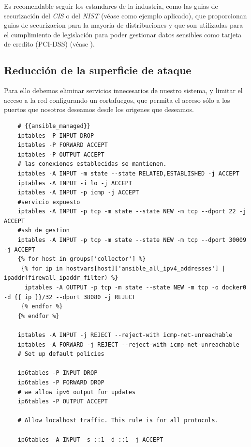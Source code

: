 Es recomendable seguir los estandares de la industria, como las guias de securización del \emph{CIS} o del 
\emph{NIST} (véase \cite{ovh-debian-cis} como ejemplo aplicado), que proporcionan guias de securizacion
para la mayoria de distribuciones y que son utilizadas para el cumplimiento de legislación para poder
gestionar datos sensibles como tarjeta de credito (PCI-DSS) (véase \cite{wiki-pci-dss}). 

\subsection{Reducción de la superficie de ataque}

Para ello debemos eliminar servicios innecesarios de nuestro sistema, y limitar el acceso a la red configurando un cortafuegos, que permita
el acceso sólo a los puertos que nosotros deseamos desde los origenes que deseamos.

\begin{verbatim}
    # {{ansible_managed}}
    iptables -P INPUT DROP
    iptables -P FORWARD ACCEPT
    iptables -P OUTPUT ACCEPT
    # las conexiones establecidas se mantienen.
    iptables -A INPUT -m state --state RELATED,ESTABLISHED -j ACCEPT
    iptables -A INPUT -i lo -j ACCEPT
    iptables -A INPUT -p icmp -j ACCEPT
    #servicio expuesto
    iptables -A INPUT -p tcp -m state --state NEW -m tcp --dport 22 -j ACCEPT
    #ssh de gestion
    iptables -A INPUT -p tcp -m state --state NEW -m tcp --dport 30009 -j ACCEPT
    {% for host in groups['collector'] %}
     {% for ip in hostvars[host]['ansible_all_ipv4_addresses'] | ipaddr(firewall_ipaddr_filter) %}
      iptables -A OUTPUT -p tcp -m state --state NEW -m tcp -o docker0 -d {{ ip }}/32 --dport 38080 -j REJECT
     {% endfor %}
    {% endfor %}
    
    iptables -A INPUT -j REJECT --reject-with icmp-net-unreachable 
    iptables -A FORWARD -j REJECT --reject-with icmp-net-unreachable     
    # Set up default policies
    
    ip6tables -P INPUT DROP
    ip6tables -P FORWARD DROP
    # we allow ipv6 output for updates
    ip6tables -P OUTPUT ACCEPT
    
    # Allow localhost traffic. This rule is for all protocols.
    
    ip6tables -A INPUT -s ::1 -d ::1 -j ACCEPT
\end{verbatim}
\bigskip

